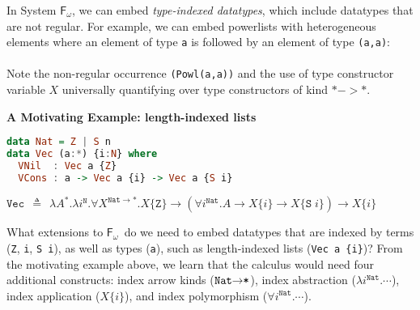 \documentclass{article}
\newcommand{\Fw}{\ensuremath{\mathsf{F}_\omega}}
\begin{document}
In System \Fw, we can embed \emph{type-indexed datatypes}, which include
datatypes that are not regular. For example, we can embed powerlists with
heterogeneous elements where an element of type \texttt{a} is followed by
an element of type \texttt{(a,a)}:\vspace*{1pt}\\
\vspace*{1pt}\\
Note the non-regular occurrence \texttt{(Powl(a,a))} and
the use of type constructor variable $X$ universally quantifying over
type constructors of kind $* -> *$.\\
\begin{center}\vspace*{-14pt}
\textbf{A Motivating Example: length-indexed lists} \vspace*{-8pt}
\end{center}
\begin{snugshade}\vspace{-7pt}
\begin{lstlisting}[basicstyle={\small\ttfamily},language=Haskell]
data Nat = Z | S n
data Vec (a:*) {i:N} where
  VNil  : Vec a {Z}
  VCons : a -> Vec a {i} -> Vec a {S i}
\end{lstlisting}\vspace*{-10pt}
\end{snugshade}\vspace*{-15pt}
\begin{snugshade}\noindent
$
\texttt{{Vec}}\:\:\triangleq\:\:\lambda A^{*}.\lambda i^{\texttt{{N}}}.
\forall X^{\texttt{{Nat}}\to*}.
X\{\texttt{{Z}}\}\to
(\forall i^{\texttt{{Nat}}}.A\to X\{i\}\to X\{\texttt{{S}}\; i\})\to X\{i\}
$
\end{snugshade}\vspace*{-5pt}
What extensions to \Fw\ do we need to embed datatypes that are indexed by
terms (\texttt{Z}, \texttt{i}, \texttt{S i}), as well as types (\texttt{a}),
such as length-indexed lists (\verb|Vec a {i}|)? From the motivating example
above, we learn that the calculus would need four additional constructs:
index arrow kinds ($\texttt{{Nat}\ensuremath{\to}*}$),
index abstraction ($\lambda i^{\texttt{{Nat}}}.\cdots$),
index application ($X\{i\}$), and
index polymorphism ($\forall i^{\texttt{{Nat}}}.\cdots$).
\end{document}
